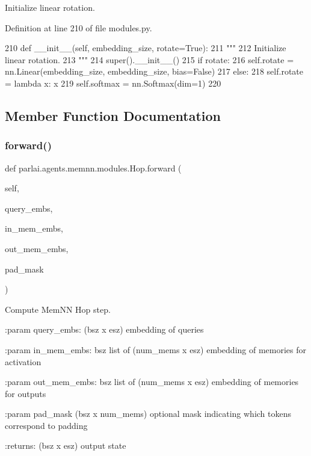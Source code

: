 \begin{DoxyVerb}Initialize linear rotation.
\end{DoxyVerb}
 

Definition at line 210 of file modules.\+py.


\begin{DoxyCode}
210     \textcolor{keyword}{def }\_\_init\_\_(self, embedding\_size, rotate=True):
211         \textcolor{stringliteral}{"""}
212 \textcolor{stringliteral}{        Initialize linear rotation.}
213 \textcolor{stringliteral}{        """}
214         super().\_\_init\_\_()
215         \textcolor{keywordflow}{if} rotate:
216             self.rotate = nn.Linear(embedding\_size, embedding\_size, bias=\textcolor{keyword}{False})
217         \textcolor{keywordflow}{else}:
218             self.rotate = \textcolor{keyword}{lambda} x: x
219         self.softmax = nn.Softmax(dim=1)
220 
\end{DoxyCode}


\subsection{Member Function Documentation}
\mbox{\label{classparlai_1_1agents_1_1memnn_1_1modules_1_1Hop_ad4e6c91364efc31ac3f0239d7a7c1376}} 
\subsubsection{\texorpdfstring{forward()}{forward()}}
{\footnotesize\ttfamily def parlai.\+agents.\+memnn.\+modules.\+Hop.\+forward (\begin{DoxyParamCaption}\item[{}]{self,  }\item[{}]{query\+\_\+embs,  }\item[{}]{in\+\_\+mem\+\_\+embs,  }\item[{}]{out\+\_\+mem\+\_\+embs,  }\item[{}]{pad\+\_\+mask }\end{DoxyParamCaption})}

\begin{DoxyVerb}Compute MemNN Hop step.

:param query_embs:
    (bsz x esz) embedding of queries

:param in_mem_embs:
    bsz list of (num_mems x esz) embedding of memories for activation

:param out_mem_embs:
    bsz list of (num_mems x esz) embedding of memories for outputs

:param pad_mask
    (bsz x num_mems) optional mask indicating which tokens correspond to
    padding

:returns:
    (bsz x esz) output state
\end{DoxyVerb}
 

